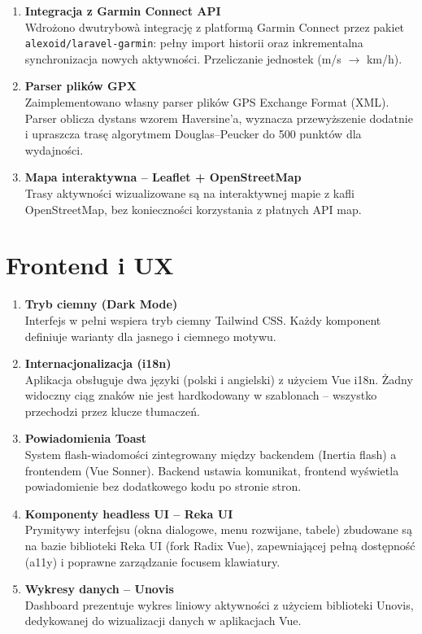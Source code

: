 \documentclass[12pt,a4paper]{report}
\begin{document}
\begin{enumerate}[resume]

\item \textbf{Integracja z Garmin Connect API} \\
Wdrożono dwutrybow\`a integrację z platformą Garmin Connect przez pakiet \texttt{alexoid/laravel-garmin}: pełny import historii oraz inkrementalna synchronizacja nowych aktywności. Przeliczanie jednostek (m/s $\to$ km/h).

\item \textbf{Parser plików GPX} \\
Zaimplementowano własny parser plików GPS Exchange Format (XML). Parser oblicza dystans wzorem Haversine'a, wyznacza przewyższenie dodatnie i upraszcza trasę algorytmem Douglas--Peucker do 500 punktów dla wydajności.

\item \textbf{Mapa interaktywna -- Leaflet + OpenStreetMap} \\
Trasy aktywności wizualizowane są na interaktywnej mapie z kafli OpenStreetMap, bez konieczności korzystania z płatnych API map.

\end{enumerate}

\section{Frontend i UX}

\begin{enumerate}[resume]

\item \textbf{Tryb ciemny (Dark Mode)} \\
Interfejs w pełni wspiera tryb ciemny Tailwind CSS. Każdy komponent definiuje warianty dla jasnego i ciemnego motywu.

\item \textbf{Internacjonalizacja (i18n)} \\
Aplikacja obsługuje dwa języki (polski i angielski) z użyciem Vue i18n. Żadny widoczny ciąg znaków nie jest hardkodowany w szablonach -- wszystko przechodzi przez klucze tłumaczeń.

\item \textbf{Powiadomienia Toast} \\
System flash-wiadomości zintegrowany między backendem (Inertia flash) a frontendem (Vue Sonner). Backend ustawia komunikat, frontend wyświetla powiadomienie bez dodatkowego kodu po stronie stron.

\item \textbf{Komponenty headless UI -- Reka UI} \\
Prymitywy interfejsu (okna dialogowe, menu rozwijane, tabele) zbudowane są na bazie biblioteki Reka UI (fork Radix Vue), zapewniającej pełną dostępność (a11y) i poprawne zarządzanie focusem klawiatury.

\item \textbf{Wykresy danych -- Unovis} \\
Dashboard prezentuje wykres liniowy aktywności z użyciem biblioteki Unovis, dedykowanej do wizualizacji danych w aplikacjach Vue.

\end{enumerate}
\end{document}
